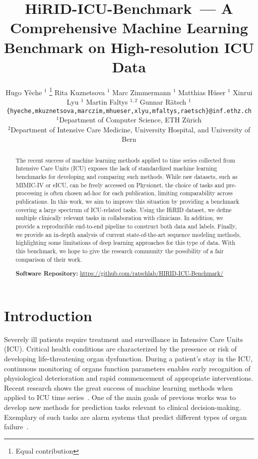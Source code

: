 \documentclass{article}
\title{HiRID-ICU-Benchmark~--- A Comprehensive Machine Learning Benchmark on High-resolution ICU Data}
\author{
    Hugo Yèche $^{1}$ \thanks{Equal contribution} \And Rita Kuznetsova $^{1}$ \footnotemark[1] \And  Marc Zimmermann $^{1}$ \AND Matthias Hüser $^{1}$ \And Xinrui Lyu $^{1}$ \And  Martin Faltys $^{1,2}$ \And Gunnar Rätsch $^{1}$ \And
    \texttt{\{hyeche,mkuznetsova,marczim,mhueser,xlyu,mfaltys,raetsch\}@inf.ethz.ch}\\
    
    \small{$^{1}$Department of Computer Science, ETH Zürich }\\
    \small{ $^{2}$Department of Intensive Care Medicine, University Hospital, and University of Bern}\\
}
\begin{document}
\maketitle



\begin{abstract}
The recent success of machine learning methods applied to time series collected from Intensive Care Units (ICU) exposes the lack of standardized machine learning benchmarks for developing and comparing such methods. While raw datasets, such as MIMIC-IV or eICU, can be freely accessed on Physionet, the choice of tasks and pre-processing is often chosen ad-hoc for each publication, limiting comparability across publications. In this work, we aim to improve this situation by providing a  benchmark covering a large spectrum of ICU-related tasks. Using the HiRID dataset, we define multiple clinically relevant tasks in collaboration with clinicians.  In addition, we provide a reproducible end-to-end pipeline to construct both data and labels. Finally, we provide an in-depth analysis of current state-of-the-art sequence modeling methods, highlighting some limitations of deep learning approaches for this type of data. With this benchmark, we hope to give the research community the possibility of a fair comparison of their work.



\smallskip
\small
\textbf{Software Repository: }\url{https://github.com/ratschlab/HIRID-ICU-Benchmark/}
\end{abstract} \section{Introduction}\label{intro}
Severely ill patients require treatment and surveillance in Intensive Care Units (ICU). Critical health conditions are characterized by the presence or risk of developing life-threatening organ dysfunction. During a patient's stay in the ICU, continuous monitoring of organs function parameters enables early recognition of physiological deterioration and rapid commencement of appropriate interventions. Recent research shows the great success of machine learning methods when applied to ICU time series~\cite{ncle, horn2020set}. One of the main goals of previous works was to develop new methods for prediction tasks relevant to clinical decision-making. Exemplary of such tasks are alarm systems that predict different types of organ failure~\cite{hyland2020early,tomavsev2019clinically}.
\end{document}
